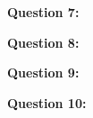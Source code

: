 \documentclass{report}
\begin{document}
    \bigbreak \noindent \bigbreak \noindent \bigbreak \noindent 
    \begin{Large}
        \textbf{Question 7:}
    \end{Large}
    \bigbreak \noindent 
    \bigbreak \noindent 

    \bigbreak \noindent \bigbreak \noindent \bigbreak \noindent 
    \begin{Large}
        \textbf{Question 8:}
    \end{Large}
    \bigbreak \noindent 
    \bigbreak \noindent 

    \bigbreak \noindent \bigbreak \noindent \bigbreak \noindent 
    \begin{Large}
        \textbf{Question 9:}
    \end{Large}
    \bigbreak \noindent 
    \bigbreak \noindent 

    \bigbreak \noindent \bigbreak \noindent \bigbreak \noindent 
    \begin{Large}
        \textbf{Question 10:}
    \end{Large}
    \bigbreak \noindent 
    \bigbreak \noindent 
    
\end{document}
